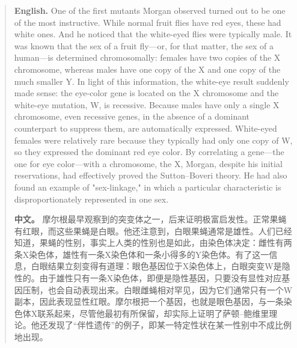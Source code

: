 \begin{quote}
\noindent\textbf{English.} One of the first mutants Morgan observed turned out to be one of the most instructive. While normal fruit flies have red eyes, these had white ones. And he noticed that the white-eyed flies were typically male. It was known that the sex of a fruit fly---or, for that matter, the sex of a human---is determined chromosomally: females have two copies of the X chromosome, whereas males have one copy of the X and one copy of the much smaller Y. In light of this information, the white-eye result suddenly made sense: the eye-color gene is located on the X chromosome and the white-eye mutation, W, is recessive. Because males have only a single X chromosome, even recessive genes, in the absence of a dominant counterpart to suppress them, are automatically expressed. White-eyed females were relatively rare because they typically had only one copy of W, so they expressed the dominant red eye color. By correlating a gene---the one for eye color---with a chromosome, the X, Morgan, despite his initial reservations, had effectively proved the Sutton--Boveri theory. He had also found an example of "sex-linkage," in which a particular characteristic is disproportionately represented in one sex.

\smallskip
\noindent\textbf{中文。} 摩尔根最早观察到的突变体之一，后来证明极富启发性。正常果蝇有红眼，而这些果蝇是白眼。他还注意到，白眼果蝇通常是雄性。人们已经知道，果蝇的性别，事实上人类的性别也是如此，由染色体决定：雌性有两条X染色体，雄性有一条X染色体和一条小得多的Y染色体。有了这一信息，白眼结果立刻变得有道理：眼色基因位于X染色体上，白眼突变W是隐性的。由于雄性只有一条X染色体，即便是隐性基因，只要没有显性对应基因压制，也会自动表现出来。白眼雌蝇相对罕见，因为它们通常只有一个W副本，因此表现显性红眼。摩尔根把一个基因，也就是眼色基因，与一条染色体X联系起来，尽管他最初有所保留，却实际上证明了萨顿--鲍维里理论。他还发现了“伴性遗传”的例子，即某一特定性状在某一性别中不成比例地出现。
\end{quote}

